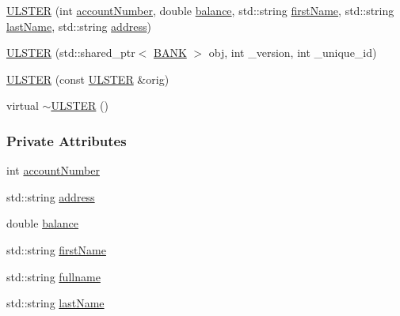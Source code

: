 \begin{DoxyCompactItemize}
\item 
\hyperlink{class_u_l_s_t_e_r_ad80944864d4f907dd30b02a1d1a563cc_ad80944864d4f907dd30b02a1d1a563cc}{U\+L\+S\+T\+ER} (int \hyperlink{class_u_l_s_t_e_r_a13f0c2ce30f9e66e896633d81c9af979_a13f0c2ce30f9e66e896633d81c9af979}{account\+Number}, double \hyperlink{class_u_l_s_t_e_r_af98d3ed41f452b28f26994552465815c_af98d3ed41f452b28f26994552465815c}{balance}, std\+::string \hyperlink{class_u_l_s_t_e_r_af8d138fdca14b59130b8b4ddd3d73b16_af8d138fdca14b59130b8b4ddd3d73b16}{first\+Name}, std\+::string \hyperlink{class_u_l_s_t_e_r_afa319e559a6a7653aa67e6d8f801d7ee_afa319e559a6a7653aa67e6d8f801d7ee}{last\+Name}, std\+::string \hyperlink{class_u_l_s_t_e_r_a7a13c5988ddafa47b8d6eea3e77fd786_a7a13c5988ddafa47b8d6eea3e77fd786}{address})
\item 
\hyperlink{class_u_l_s_t_e_r_ac7207ca64f86ef3081e176deb222805d_ac7207ca64f86ef3081e176deb222805d}{U\+L\+S\+T\+ER} (std\+::shared\+\_\+ptr$<$ \hyperlink{class_b_a_n_k}{B\+A\+NK} $>$ obj, int \+\_\+version, int \+\_\+unique\+\_\+id)
\item 
\hyperlink{class_u_l_s_t_e_r_ad8847497742850609cd4748bbb6d0a8e_ad8847497742850609cd4748bbb6d0a8e}{U\+L\+S\+T\+ER} (const \hyperlink{class_u_l_s_t_e_r}{U\+L\+S\+T\+ER} \&orig)
\item 
virtual \hyperlink{class_u_l_s_t_e_r_a4ceb68bdbc806f74f9e55096f8223453_a4ceb68bdbc806f74f9e55096f8223453}{$\sim$\+U\+L\+S\+T\+ER} ()
\end{DoxyCompactItemize}
\subsubsection*{Private Attributes}
\begin{DoxyCompactItemize}
\item 
int \hyperlink{class_u_l_s_t_e_r_a13f0c2ce30f9e66e896633d81c9af979_a13f0c2ce30f9e66e896633d81c9af979}{account\+Number}
\item 
std\+::string \hyperlink{class_u_l_s_t_e_r_a7a13c5988ddafa47b8d6eea3e77fd786_a7a13c5988ddafa47b8d6eea3e77fd786}{address}
\item 
double \hyperlink{class_u_l_s_t_e_r_af98d3ed41f452b28f26994552465815c_af98d3ed41f452b28f26994552465815c}{balance}
\item 
std\+::string \hyperlink{class_u_l_s_t_e_r_af8d138fdca14b59130b8b4ddd3d73b16_af8d138fdca14b59130b8b4ddd3d73b16}{first\+Name}
\item 
std\+::string \hyperlink{class_u_l_s_t_e_r_a5dc42cbd515825463ba31c8d3dcfe1b6_a5dc42cbd515825463ba31c8d3dcfe1b6}{fullname}
\item 
std\+::string \hyperlink{class_u_l_s_t_e_r_afa319e559a6a7653aa67e6d8f801d7ee_afa319e559a6a7653aa67e6d8f801d7ee}{last\+Name}
\end{DoxyCompactItemize}


